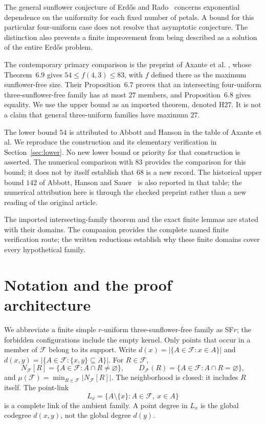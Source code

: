 \documentclass[11pt,a4paper]{article}
\numberwithin{equation}{section}
\theoremstyle{remark}
\newcommand{\F}{\mathcal F}
\begin{document}
The general sunflower conjecture of Erd\H{o}s and Rado~\cite{ER1960}
concerns exponential dependence on the
uniformity for each fixed number of petals. A bound for this particular
four-uniform case does not resolve that asymptotic conjecture. The distinction
also prevents a finite improvement from being described as a solution of the
entire Erd\H{o}s problem.

The contemporary primary comparison is the preprint of Axante et al.
\cite{AXB2026}, whose Theorem~6.9 gives $54\le f(4,3)\le83$, with $ f $
defined there as the maximum sunflower-free size. Their Proposition~6.7
proves that an intersecting four-uniform three-sunflower-free family has at
most $27$ members, and Proposition~6.8 gives equality. We use the upper bound
as an imported theorem, denoted H27. It is not a claim that general
three-uniform families have maximum $27$.

The lower bound $54$ is attributed to Abbott and Hanson
\cite{AH1974} in the table of Axante et al. We reproduce the construction
and its elementary verification in Section~\ref{sec:lower}. No new lower
bound or priority for that construction is asserted. The numerical
comparison with $83$ provides the comparison for this bound; it does not by
itself establish that $68$ is a new record. The historical upper
bound $142$ of Abbott, Hanson and Sauer~\cite{AHS1972} is also
reported in that table; the numerical attribution here is through
the checked preprint rather than a new reading of the original article.



The imported intersecting-family theorem and the exact finite lemmas are
stated with their domains. The companion provides the complete named
finite verification route; the written reductions establish why these
finite domains cover every hypothetical family.

\section{Notation and the proof architecture}
\label{sec:notation}
We abbreviate a finite simple $r$-uniform three-sunflower-free family
as SF$r$; the forbidden configurations include the empty kernel.
Only points that occur in a member of $\F $ belong to its support. Write
$ d(x)=\lvert\{A\in\F:x\in A\}\rvert $ and
$ d(x,y)=\lvert\{A\in\F:\{x,y\}\subseteq A\}\rvert $. For $ R\in\F $,
\[
 N_{\F}[R]=\{A\in\F:A\cap R\ne\varnothing\},\qquad
 D_{\F}(R)=\{A\in\F:A\cap R=\varnothing\},
\]
and $\mu(\F)=\min_{R\in\F}\lvert N_{\F}[R]\rvert $.
The neighborhood is closed: it includes $ R $ itself. The point-link
\[
 L_x=\{A\setminus\{x\}:A\in\F,\ x\in A\}
\]
is a complete link of the ambient family. A point degree in $ L_x $ is the
global codegree $ d(x,y)$, not the global degree $ d(y)$.
\end{document}
